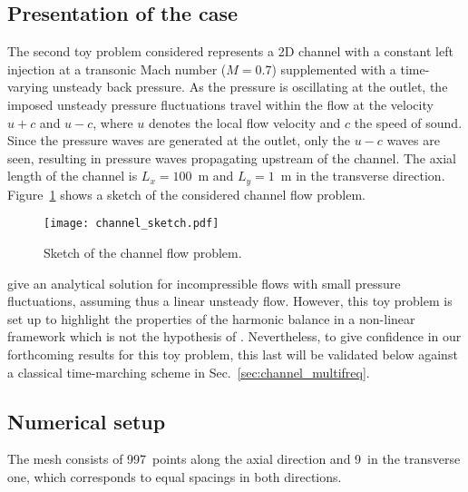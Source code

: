 \subsection{Presentation of the case}
\label{sub:presentation_of_the_case}

The second toy problem considered represents a 2D channel 
with a constant left injection at 
a transonic Mach number ($M=0.7$)
supplemented with a time-varying unsteady back pressure.
As the pressure is oscillating at the outlet, the imposed unsteady pressure
fluctuations travel within the flow at the velocity 
$u + c$ and $u - c$, where $u$ denotes 
the local flow velocity and $c$ the speed of sound.
Since the pressure waves are generated at the outlet, only
the $u-c$ waves are seen, resulting in pressure waves propagating
upstream of the channel. The axial length of the channel is $L_x = 100$~m
and $L_y = 1$~m in the transverse direction.
Figure~\ref{fig:canal_principle} shows a sketch
of the considered channel flow problem.
\begin{figure}
  \centering
  \texttt{[image: channel\_sketch.pdf]}
  \caption{Sketch of the channel flow problem.}
  \label{fig:canal_principle}
\end{figure}

\citet{Merkle1987} give an analytical solution
for incompressible flows with small pressure fluctuations, assuming
thus a linear unsteady flow.
However, this toy problem is set up to highlight the properties
of the harmonic balance in a non-linear framework which is not
the hypothesis of \citet{Merkle1987}. Nevertheless, to give confidence
in our forthcoming results for this toy problem,
this last will be validated below against a classical time-marching scheme
in Sec.~\ref{sec:channel_multifreq}.

\subsection{Numerical setup}

The mesh consists of 997~points along the axial direction and 9~in the
transverse one, which corresponds to equal spacings in both
directions. 


